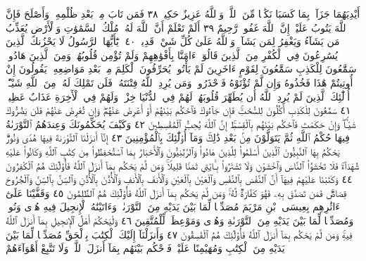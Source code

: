 أَيْدِيَهُمَا جَزَآءَۢ بِمَا كَسَبَا نَكَٰلࣰا مِّنَ ٱللَّهِۗ وَٱللَّهُ عَزِيزٌ
حَكِيمࣱ ٣٨ فَمَن تَابَ مِنۢ بَعْدِ ظُلْمِهِۦ وَأَصْلَحَ فَإِنَّ ٱللَّهَ
يَتُوبُ عَلَيْهِۚ إِنَّ ٱللَّهَ غَفُورࣱ رَّحِيمٌ ٣٩ أَلَمْ تَعْلَمْ أَنَّ ٱللَّهَ
لَهُۥ مُلْكُ ٱلسَّمَٰوَٰتِ وَٱلْأَرْضِ يُعَذِّبُ مَن يَشَآءُ وَيَغْفِرُ
لِمَن يَشَآءُۗ وَٱللَّهُ عَلَىٰ كُلِّ شَيْءࣲ قَدِيرࣱ ٤٠۞ يَٰٓأَيُّهَا
ٱلرَّسُولُ لَا يَحْزُنكَ ٱلَّذِينَ يُسَٰرِعُونَ فِي ٱلْكُفْرِ مِنَ
ٱلَّذِينَ قَالُوٓا۟ ءَامَنَّا بِأَفْوَٰهِهِمْ وَلَمْ تُؤْمِن قُلُوبُهُمْۛ وَمِنَ
ٱلَّذِينَ هَادُوا۟ۛ سَمَّٰعُونَ لِلْكَذِبِ سَمَّٰعُونَ لِقَوْمٍ
ءَاخَرِينَ لَمْ يَأْتُوكَۖ يُحَرِّفُونَ ٱلْكَلِمَ مِنۢ بَعْدِ مَوَاضِعِهِۦۖ
يَقُولُونَ إِنْ أُوتِيتُمْ هَٰذَا فَخُذُوهُ وَإِن لَّمْ تُؤْتَوْهُ
فَٱحْذَرُوا۟ۚ وَمَن يُرِدِ ٱللَّهُ فِتْنَتَهُۥ فَلَن تَمْلِكَ لَهُۥ مِنَ ٱللَّهِ
شَيْـًٔاۚ أُو۟لَٰٓئِكَ ٱلَّذِينَ لَمْ يُرِدِ ٱللَّهُ أَن يُطَهِّرَ قُلُوبَهُمْۚ لَهُمْ
فِي ٱلدُّنْيَا خِزْيࣱۖ وَلَهُمْ فِي ٱلْأٓخِرَةِ عَذَابٌ عَظِيمࣱ ٤١
سَمَّٰعُونَ لِلْكَذِبِ أَكَّٰلُونَ لِلسُّحْتِۚ فَإِن جَآءُوكَ
فَٱحْكُم بَيْنَهُمْ أَوْ أَعْرِضْ عَنْهُمْۖ وَإِن تُعْرِضْ عَنْهُمْ فَلَن
يَضُرُّوكَ شَيْـࣰٔاۖ وَإِنْ حَكَمْتَ فَٱحْكُم بَيْنَهُم بِٱلْقِسْطِۚ
إِنَّ ٱللَّهَ يُحِبُّ ٱلْمُقْسِطِينَ ٤٢ وَكَيْفَ يُحَكِّمُونَكَ
وَعِندَهُمُ ٱلتَّوْرَىٰةُ فِيهَا حُكْمُ ٱللَّهِ ثُمَّ يَتَوَلَّوْنَ مِنۢ بَعْدِ
ذَٰلِكَۚ وَمَآ أُو۟لَٰٓئِكَ بِٱلْمُؤْمِنِينَ ٤٣ إِنَّآ أَنزَلْنَا ٱلتَّوْرَىٰةَ
فِيهَا هُدࣰى وَنُورࣱۚ يَحْكُمُ بِهَا ٱلنَّبِيُّونَ ٱلَّذِينَ أَسْلَمُوا۟
لِلَّذِينَ هَادُوا۟ وَٱلرَّبَّٰنِيُّونَ وَٱلْأَحْبَارُ بِمَا ٱسْتُحْفِظُوا۟ مِن
كِتَٰبِ ٱللَّهِ وَكَانُوا۟ عَلَيْهِ شُهَدَآءَۚ فَلَا تَخْشَوُا۟ ٱلنَّاسَ
وَٱخْشَوْنِ وَلَا تَشْتَرُوا۟ بِـَٔايَٰتِي ثَمَنࣰا قَلِيلࣰاۚ وَمَن لَّمْ يَحْكُم
بِمَآ أَنزَلَ ٱللَّهُ فَأُو۟لَٰٓئِكَ هُمُ ٱلْكَٰفِرُونَ ٤٤ وَكَتَبْنَا
عَلَيْهِمْ فِيهَآ أَنَّ ٱلنَّفْسَ بِٱلنَّفْسِ وَٱلْعَيْنَ بِٱلْعَيْنِ وَٱلْأَنفَ
بِٱلْأَنفِ وَٱلْأُذُنَ بِٱلْأُذُنِ وَٱلسِّنَّ بِٱلسِّنِّ وَٱلْجُرُوحَ
قِصَاصࣱۚ فَمَن تَصَدَّقَ بِهِۦ فَهُوَ كَفَّارَةࣱ لَّهُۥۚ وَمَن
لَّمْ يَحْكُم بِمَآ أَنزَلَ ٱللَّهُ فَأُو۟لَٰٓئِكَ هُمُ ٱلظَّٰلِمُونَ ٤٥
وَقَفَّيْنَا عَلَىٰٓ ءَاثَٰرِهِم بِعِيسَى ٱبْنِ مَرْيَمَ مُصَدِّقࣰا لِّمَا بَيْنَ يَدَيْهِ
مِنَ ٱلتَّوْرَىٰةِۖ وَءَاتَيْنَٰهُ ٱلْإِنجِيلَ فِيهِ هُدࣰى وَنُورࣱ وَمُصَدِّقࣰا
لِّمَا بَيْنَ يَدَيْهِ مِنَ ٱلتَّوْرَىٰةِ وَهُدࣰى وَمَوْعِظَةࣰ لِّلْمُتَّقِينَ ٤٦
وَلْيَحْكُمْ أَهْلُ ٱلْإِنجِيلِ بِمَآ أَنزَلَ ٱللَّهُ فِيهِۚ وَمَن لَّمْ يَحْكُم
بِمَآ أَنزَلَ ٱللَّهُ فَأُو۟لَٰٓئِكَ هُمُ ٱلْفَٰسِقُونَ ٤٧ وَأَنزَلْنَآ إِلَيْكَ
ٱلْكِتَٰبَ بِٱلْحَقِّ مُصَدِّقࣰا لِّمَا بَيْنَ يَدَيْهِ مِنَ ٱلْكِتَٰبِ
وَمُهَيْمِنًا عَلَيْهِۖ فَٱحْكُم بَيْنَهُم بِمَآ أَنزَلَ ٱللَّهُۖ وَلَا تَتَّبِعْ أَهْوَآءَهُمْ
